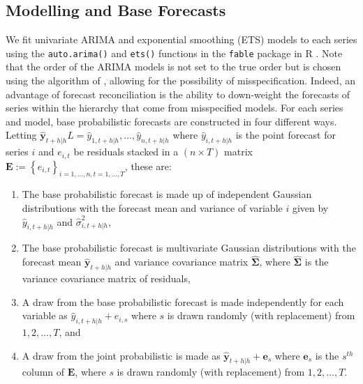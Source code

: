 \documentclass[12pt]{article}
\theoremstyle{definition}
\begin{document}

\subsection{Modelling and Base Forecasts}

We fit univariate ARIMA and exponential smoothing (ETS) models to each series using the \verb|auto.arima()| and \verb|ets()| functions in the \verb|fable| package \citep{Rfable} in R \citep{Rcore}.  Note that the order of the ARIMA models is not set to the true order but is chosen using the algorithm of \cite{hynkan2007}, allowing for the possibility of misspecification.  Indeed, an advantage of forecast reconciliation is the ability to down-weight the forecasts of series within the hierarchy that come from misspecified models.  For each series and model, base probabilistic forecasts are constructed in four different ways.  Letting $\hat{\bm y}_{t+h|h}L=\hat{y}_{1,t+h|h},\ldots,\hat{y}_{n,t+h|h}$ where $\hat{y}_{i,t+h|h}$ is the point forecast for series $i$ and $e_{i,t}$ be residuals stacked in a $(n \times T)$ matrix $\bm{E}:=\left\{e_{i,t}\right\}_{i=1,\dots,n,t=1,\dots,T}$, these are:

\begin{enumerate}[label=(\alph*)]
	\item The base probabilistic forecast is made up of independent Gaussian distributions with the forecast mean and variance of variable $i$ given by $\hat{y}_{i,t+h|h}$ and $\hat{\sigma}^2_{i,t+h|h}$,
	\item The base probabilistic forecast is multivariate Gaussian distributions with the forecast mean $\hat{\bm{y}}_{t+h|h}$ and variance covariance matrix $\hat{\bm\Sigma}$, where $\hat{\bm\Sigma}$ is the variance covariance matrix of residuals,
	\item A draw from the base probabilistic forecast is made independently for each variable as $\hat{y}_{i,t+h|h}+e_{i,s}$ where $s$ is drawn randomly (with replacement) from $1,2,\ldots, T$, and
	\item A draw from the joint probabilistic is made as $\hat{\bm y}_{t+h|h}+\bm{e}_{s}$ where $\bm{e}_{s}$ is the $s^{th}$ column of $\bm{E}$, where $s$ is drawn randomly (with replacement) from $1,2,\ldots, T$.
\end{enumerate}
\end{document}
